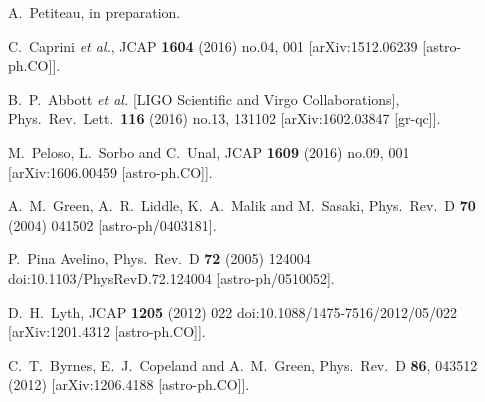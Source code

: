 \begin{thebibliography}{10}
 A.~Petiteau, in preparation.

  C.~Caprini {\it et al.},
  JCAP {\bf 1604} (2016) no.04,  001
  [arXiv:1512.06239 [astro-ph.CO]].


  B.~P.~Abbott {\it et al.} [LIGO Scientific and Virgo Collaborations],
  Phys.\ Rev.\ Lett.\  {\bf 116} (2016) no.13,  131102
  [arXiv:1602.03847 [gr-qc]].


  M.~Peloso, L.~Sorbo and C.~Unal,
  JCAP {\bf 1609} (2016) no.09,  001
  [arXiv:1606.00459 [astro-ph.CO]].


  A.~M.~Green, A.~R.~Liddle, K.~A.~Malik and M.~Sasaki,
  Phys.\ Rev.\ D {\bf 70} (2004) 041502
  [astro-ph/0403181].

  P.~Pina Avelino,
  Phys.\ Rev.\ D {\bf 72} (2005) 124004
  doi:10.1103/PhysRevD.72.124004
  [astro-ph/0510052].

  D.~H.~Lyth,
  JCAP {\bf 1205} (2012) 022
  doi:10.1088/1475-7516/2012/05/022
  [arXiv:1201.4312 [astro-ph.CO]].

  C.~T.~Byrnes, E.~J.~Copeland and A.~M.~Green,
  Phys.\ Rev.\ D {\bf 86}, 043512 (2012)
  [arXiv:1206.4188 [astro-ph.CO]].



\end{thebibliography}
